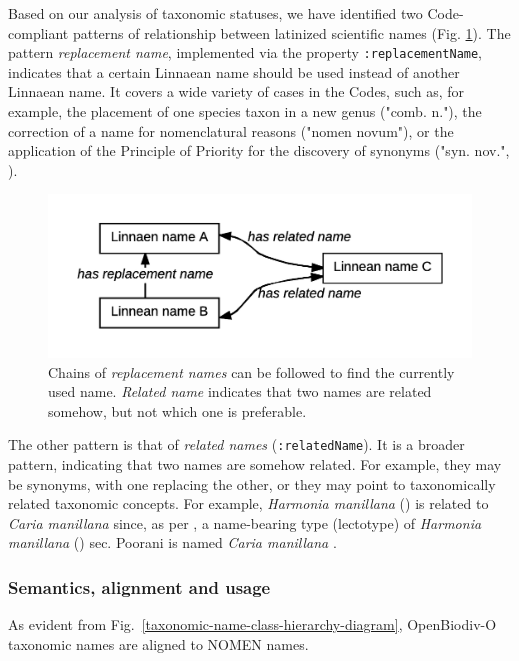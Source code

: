Based on our analysis of taxonomic statuses, we have identified two Code-compliant patterns of relationship between latinized scientific names (Fig. \ref{scientific-name-patterns}). The pattern \emph{replacement name}, implemented via the property {\tt :replacementName}, indicates that a certain Linnaean name should be used instead of another Linnaean name. It covers a wide variety of cases in the Codes, such as, for example, the placement of one species taxon in a new genus ("comb. n."), the correction of a name for nomenclatural reasons ("nomen novum"), or the application of the Principle of Priority for the discovery of synonyms ("syn. nov.", \cite{international_commission_on_zoological_nomenclature_official_2017}).

\begin{figure}[h!]
 \centering
  \includegraphics[width=\textwidth]{Figures/scientific-name-patterns}
  \decoRule
  \caption[Scientific name patterns diagram.]{
  Chains of \emph{replacement names} can be followed to find the currently used name. \emph{Related name} indicates that two names are related somehow, but not which one is preferable.}
  \label{scientific-name-patterns}
\end{figure}

The other pattern is that of \emph{related names} ({\tt :relatedName}). It is a broader pattern, indicating that two names are somehow related. For example, they may be synonyms, with one replacing the other, or they may point to taxonomically related taxonomic concepts. For example, \emph{Harmonia manillana} (\cite{mulsant_monographie_1866}) is related to \emph{Caria manillana} \cite{mulsant_monographie_1866} since, as per \cite{poorani_harmonia_2016}, a name-bearing type (lectotype) of \emph{Harmonia manillana} (\cite{mulsant_monographie_1866}) sec. Poorani \cite{poorani_harmonia_2016} is named \emph{Caria manillana} \cite{mulsant_monographie_1866}.

\subsubsection*{Semantics, alignment and usage}
As evident from Fig.~\ref{taxonomic-name-class-hierarchy-diagram}, OpenBiodiv-O taxonomic names are aligned to NOMEN names.

